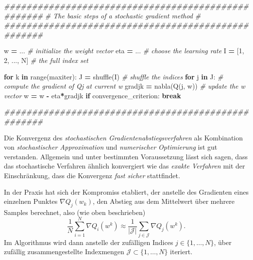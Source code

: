 \documentclass[]{book}
\newenvironment{Shaded}{\begin{snugshade}}{\end{snugshade}}
\newcommand{\BuiltInTok}[1]{#1}
\newcommand{\CommentTok}[1]{\textcolor[rgb]{0.56,0.35,0.01}{\textit{#1}}}
\newcommand{\ControlFlowTok}[1]{\textcolor[rgb]{0.13,0.29,0.53}{\textbf{#1}}}
\newcommand{\DecValTok}[1]{\textcolor[rgb]{0.00,0.00,0.81}{#1}}
\newcommand{\KeywordTok}[1]{\textcolor[rgb]{0.13,0.29,0.53}{\textbf{#1}}}
\newcommand{\NormalTok}[1]{#1}
\newcommand{\OperatorTok}[1]{\textcolor[rgb]{0.81,0.36,0.00}{\textbf{#1}}}
\theoremstyle{definition}
\theoremstyle{definition}
\theoremstyle{definition}
\theoremstyle{definition}
\theoremstyle{remark}
\begin{document}
\begin{Shaded}
\begin{Highlighting}[]
\CommentTok{###################################################}
\CommentTok{# The basic steps of a stochastic gradient method #}
\CommentTok{###################################################}

\NormalTok{w }\OperatorTok{=}\NormalTok{ ...  }\CommentTok{# initialize the weight vector}
\NormalTok{eta }\OperatorTok{=}\NormalTok{ ... }\CommentTok{# choose the learning rate}
\NormalTok{I }\OperatorTok{=}\NormalTok{ [}\DecValTok{1}\NormalTok{, }\DecValTok{2}\NormalTok{, ..., N]  }\CommentTok{# the full index set}

\ControlFlowTok{for}\NormalTok{ k }\KeywordTok{in} \BuiltInTok{range}\NormalTok{(maxiter):}
\NormalTok{    J }\OperatorTok{=}\NormalTok{ shuffle(I)  }\CommentTok{# shuffle the indices}
    \ControlFlowTok{for}\NormalTok{ j }\KeywordTok{in}\NormalTok{ J:}
        \CommentTok{# compute the gradient of Qj at current w}
\NormalTok{        gradjk }\OperatorTok{=}\NormalTok{ nabla(Q(j, w))  }
        \CommentTok{# update the w vector}
\NormalTok{        w }\OperatorTok{=}\NormalTok{ w }\OperatorTok{-}\NormalTok{ eta}\OperatorTok{*}\NormalTok{gradjk}
    \ControlFlowTok{if}\NormalTok{ convergence_criterion:}
       \ControlFlowTok{break}

\CommentTok{###################################################}
\end{Highlighting}
\end{Shaded}

Die Konvergenz des \emph{stochastischen Gradientenabstiegsverfahren} als Kombination von \emph{stochastischer Approximation} und \emph{numerischer Optimierung} ist gut verstanden. Allgemein und unter bestimmten Voraussetzung lässt sich sagen, dass das stochastische Verfahren ähnlich konvergiert wie das \emph{exakte Verfahren} mit der Einschränkung, dass die Konvergenz \emph{fast sicher} stattfindet.

In der Praxis hat sich der Kompromiss etabliert, der anstelle des Gradienten eines einzelnen Punktes \(\nabla Q_j(w_k)\), den Abstieg aus dem Mittelwert über mehrere Samples berechnet, also (wie oben beschrieben)
\begin{equation*}
\frac{1}{N} \sum_{i=1}^N \nabla Q_i(w^k) \approx \frac{1}{|\mathcal J|} \sum_{j\in \mathcal J} \nabla Q_j(w^k).
\end{equation*}
Im Algorithmus wird dann anstelle der zufälligen Indices \(j \in \{1, \dotsc, N\}\), über zufällig zusammengestellte Indexmengen \(\mathcal J \subset \{1, \dotsc, N\}\) iteriert.
\end{document}
